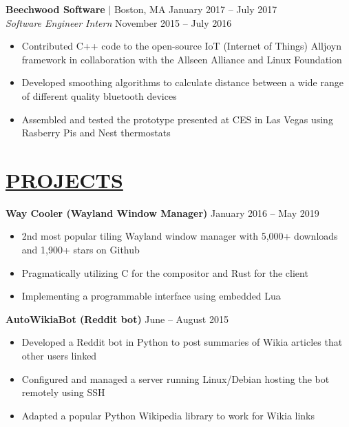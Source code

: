 \documentclass[overlapped,line]{res}
\begin{document}
\begin{resume}
\textbf{Beechwood Software} $|$ Boston, MA \hfill January 2017 \--- July 2017\\
{\sl Software Engineer Intern} \hfill November 2015 \--- July 2016
\begin{itemize}  \itemsep -2pt
	\item Contributed C++ code to the open-source IoT (Internet of Things) Alljoyn framework in collaboration with the Allseen Alliance and Linux Foundation
	\item Developed smoothing algorithms to calculate distance between a wide range of different quality bluetooth devices
	\item Assembled and tested the prototype presented at CES in Las Vegas using Rasberry Pis and Nest thermostats
\end{itemize}
\noindent\makebox[7.15in]{\rule{7.15in}{0.4pt}}


\section{\underline{PROJECTS}}
\textbf{Way Cooler (Wayland Window Manager)} \hfill January 2016 \--- May 2019
\begin{itemize}  \itemsep -2pt
	\item 2nd most popular tiling Wayland window manager with 5,000+ downloads and 1,900+ stars on Github
	\item Pragmatically utilizing C for the compositor and Rust for the client
	\item Implementing a programmable interface using embedded Lua
\end{itemize}

\textbf{AutoWikiaBot (Reddit bot)} \hfill            June \--- August 2015
\begin{itemize}  \itemsep -2pt
	\item Developed a Reddit bot in Python to post summaries of Wikia articles that other users linked
	\item Configured and managed a server running Linux/Debian hosting the bot remotely using SSH
	\item Adapted a popular Python Wikipedia library to work for Wikia links
\end{itemize}

\end{resume}
\end{document}
